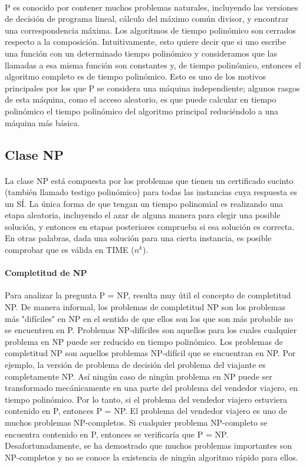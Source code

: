\documentclass[11pt, a4paper,spanish]{article}
\begin{document}
				\paragraph{}
				P es conocido por contener muchos problemas naturales, incluyendo las versiones de decisión de programa lineal, cálculo del máximo común divisor, y encontrar una correspondencia máxima. Los algoritmos de tiempo polinómico son cerrados respecto a la composición. Intuitivamente, esto quiere decir que si uno escribe una función con un determinado tiempo polinómico y consideramos que las llamadas a esa misma función son constantes y, de tiempo polinómico, entonces el algoritmo completo es de tiempo polinómico. Esto es uno de los motivos principales por los que P se considera una máquina independiente; algunos rasgos de esta máquina, como el acceso aleatorio, es que puede calcular en tiempo polinómico el tiempo polinómico del algoritmo principal reduciéndolo a una máquina más básica.
			
			\subsection{Clase NP}
				\paragraph{}
				La clase NP está compuesta por los problemas que tienen un certificado sucinto (también llamado testigo polinómico) para todas las instancias cuya respuesta es un SÍ. La única forma de que tengan un tiempo polinomial es realizando una etapa aleatoria, incluyendo el azar de alguna manera para elegir una posible solución, y entonces en etapas posteriores comprueba si esa solución es correcta. En otras palabras, dada una solución para una cierta instancia, es posible comprobar que es válida en TIME ($n^k$).


				\paragraph{Completitud de NP}
				Para analizar la pregunta P = NP, resulta muy útil el concepto de completitud NP. De manera informal, los problemas de completitud NP son los problemas más "difíciles" en NP en el sentido de que ellos son los que son más probable no se encuentren en P. Problemas NP-difíciles son aquellos para los cuales cualquier problema en NP puede ser reducido en tiempo polinómico. Los problemas de completitud NP son aquellos problemas NP-difícil que se encuentran en NP. Por ejemplo, la versión de problema de decisión del problema del viajante es completamente NP. Así ningún caso de ningún problema en NP puede ser transformado mecánicamente en una parte del problema del vendedor viajero, en tiempo polinómico. Por lo tanto, si el problema del vendedor viajero estuviera contenido en P, entonces P = NP. El problema del vendedor viajero es uno de muchos problemas NP-completos. Si cualquier problema NP-completo se encuentra contenido en P, entonces se verificaría que P = NP. Desafortunadamente, se ha demostrado que muchos problemas importantes son NP-completos y no se conoce la existencia de ningún algoritmo rápido para ellos.
\end{document}

